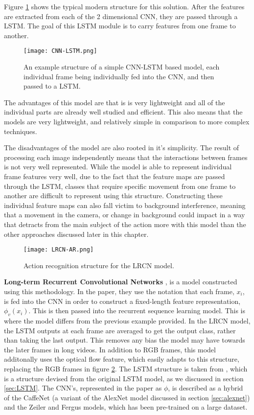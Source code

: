 Figure \ref{fig:cnn-lstm} shows the typical modern structure for this solution. After the features are extracted from each of the 2 dimensional CNN, they are passed through a LSTM. The goal of this LSTM module is to carry features from one frame to another.

\begin{figure}[h]
	\texttt{[image: CNN-LSTM.png]}
	\centering
	\caption{An example structure of a simple CNN-LSTM based model, each individual frame being individually fed into the CNN, and then passed to a LSTM.}
	\label{fig:cnn-lstm}
\end{figure}

The advantages of this model are that is is very lightweight and all of the individual parts are already well studied and efficient. This also means that the models are very lightweight, and relatively simple in comparison to more complex techniques.

The disadvantages of the model are also rooted in it's simplicity. The result of processing each image independently means that the interactions between frames is not very well represented. While the model is able to represent individual frame features very well, due to the fact that the feature maps are passed through the LSTM, classes that require specific movement from one frame to another are difficult to represent using this structure. Constructing these individual feature maps can also fall victim to background interference, meaning that a movement in the camera, or change in background could impact in a way that detracts from the main subject of the action more with this model than the other approaches discussed later in this chapter.

\begin{figure}[h]
	\texttt{[image: LRCN-AR.png]}
	\centering
	\caption{Action recognition structure for the LRCN model. \cite{LRCNS}}
	\label{fig:lrcn-ar}
\end{figure}

\textbf{Long-term Recurrent Convolutional Networks} \cite{LRCNS}, is a model constructed using this methodology. In the paper, they use the notation that each frame, $x_{i}$, is fed into the CNN in order to construct a fixed-length feature representation, $\phi_{v}(x_{i})$. This is then passed into the recurrent sequence learning model. This is where the model differs from the previous example provided. In the LRCN model, the LSTM outputs at each frame are averaged to get the output class, rather than taking the last output. This removes any bias the model may have towards the later frames in long videos. In addition to RGB frames, this model additonally uses the optical flow feature, which easily adapts to this structure, replacing the RGB frames in figure \ref{fig:lrcn-ar}. The LSTM structure is taken from \cite{LSTM-2015}, which is a structure devised from the original LSTM model, as we discussed in section \ref{sec:LSTM}. The CNN's, represented in the paper as $\phi$, is described as a hybrid of the CaffeNet \cite{caffenet} (a variant of the AlexNet \cite{alexnet} model discussed in section \ref{sec:alexnet}) and the Zeiler and Fergus \cite{zeilerfergus} models, which has been pre-trained on a large dataset.

